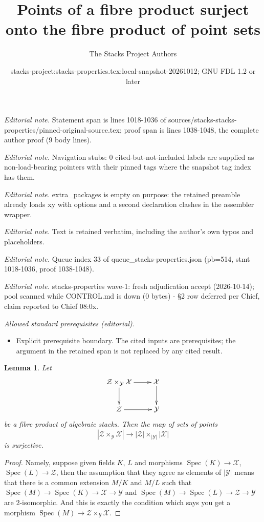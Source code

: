\documentclass[10pt,a4paper]{amsart}
\title{Points of a fibre product surject onto the fibre product of point sets}
\author{The Stacks Project Authors}
\date{stacks-project:stacks-properties.tex:local-snapshot-20261012; GNU FDL 1.2 or later}
\theoremstyle{plain}
\newtheorem{lemma}[subsection]{Lemma}
\theoremstyle{definition}
\theoremstyle{remark}
\numberwithin{equation}{subsection}
\def\Spec{\mathop{\mathrm{Spec}}}
\begin{document}
\maketitle
\noindent\textit{Editorial note.} Statement span is lines 1018-1036 of sources/stacks-stacks-properties/pinned-original-source.tex; proof span is lines 1038-1048, the complete author proof (9 body lines).\par\medskip
\noindent\textit{Editorial note.} Navigation stubs: 0 cited-but-not-included labels are supplied as non-load-bearing pointers with their pinned tags where the snapshot tag index has them.\par\medskip
\noindent\textit{Editorial note.} extra\_packages is empty on purpose: the retained preamble already loads xy with options and a second declaration clashes in the assembler wrapper.\par\medskip
\noindent\textit{Editorial note.} Text is retained verbatim, including the author's own typos and placeholders.\par\medskip
\noindent\textit{Editorial note.} Queue index 33 of queue\_stacks-properties.json (pb=514, stmt 1018-1036, proof 1038-1048).\par\medskip
\noindent\textit{Editorial note.} stacks-properties wave-1: fresh adjudication accept (2026-10-14); pool scanned while CONTROL.md is down (0 bytes) - §2 row deferred per Chief, claim reported to Chief 08:0x.\par\medskip
\noindent\textit{Allowed standard prerequisites (editorial).}\begin{itemize}
\item Explicit prerequisite boundary. The cited inputs are prerequisites; the argument in the retained span is not replaced by any cited result.
\end{itemize}\medskip
\begin{lemma}
\label{lemma-points-cartesian}
Let
$$
\xymatrix{
\mathcal{Z} \times_\mathcal{Y} \mathcal{X} \ar[r] \ar[d] &
\mathcal{X} \ar[d] \\
\mathcal{Z} \ar[r] & \mathcal{Y}
}
$$
be a fibre product of algebraic stacks. Then the map of sets
of points
$$
|\mathcal{Z} \times_\mathcal{Y} \mathcal{X}|
\longrightarrow
|\mathcal{Z}| \times_{|\mathcal{Y}|} |\mathcal{X}|
$$
is surjective.
\end{lemma}

\begin{proof}
Namely, suppose given fields $K$, $L$ and morphisms
$\Spec(K) \to \mathcal{X}$, $\Spec(L) \to \mathcal{Z}$,
then the assumption that they agree as elements of $|\mathcal{Y}|$ means that
there is a common extension $M/K$ and $M/L$
such that
$\Spec(M) \to \Spec(K) \to \mathcal{X} \to \mathcal{Y}$ and
$\Spec(M) \to \Spec(L) \to \mathcal{Z} \to \mathcal{Y}$
are $2$-isomorphic. And this is exactly the condition which says you get a
morphism $\Spec(M) \to \mathcal{Z} \times_\mathcal{Y} \mathcal{X}$.
\end{proof}
\end{document}

